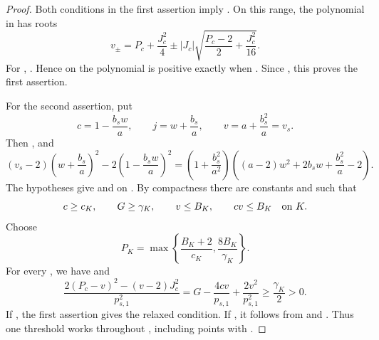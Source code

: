 \begin{proof}
Both conditions in the first assertion imply . On this range, the polynomial  in  has roots
\[
  v_{\pm}=P_c+\frac{J_c^2}{4}\pm |J_c|\sqrt{\frac{P_c-2}{2}+\frac{J_c^2}{16}}.
\]
For , . Hence on  the polynomial is positive exactly when . Since , this proves the first assertion.

For the second assertion, put
\[
  c=1-\frac{b_sw}{a},\qquad j=w+\frac{b_s}{a},\qquad v=a+\frac{b_s^2}{a}=v_s.
\]
Then , and
\[
  (v_s-2)\left(w+\frac{b_s}{a}\right)^2-2\left(1-\frac{b_sw}{a}\right)^2
  =\left(1+\frac{b_s^2}{a^2}\right)\left((a-2)w^2+2b_sw+\frac{b_s^2}{a}-2\right).
\]
The hypotheses give  and  on . By compactness there are constants  and  such that
\[
  c\geq c_K,\qquad G\geq\gamma_K,\qquad v\leq B_K,\qquad cv\leq B_K\quad\hbox{on }K.
\]
Choose
\[
  P_K=\max\left\{\frac{B_K+2}{c_K},\frac{8B_K}{\gamma_K}\right\}.
\]
%
For every , we have  and
\[
  \frac{2(P_c-v)^2-(v-2)J_c^2}{p_{s,1}^2}
  =G-\frac{4cv}{p_{s,1}}+\frac{2v^2}{p_{s,1}^2}
  \geq\frac{\gamma_K}{2}>0.
\]
If , the first assertion gives the relaxed condition. If , it follows from  and . Thus one threshold works throughout , including points with .
\end{proof}


